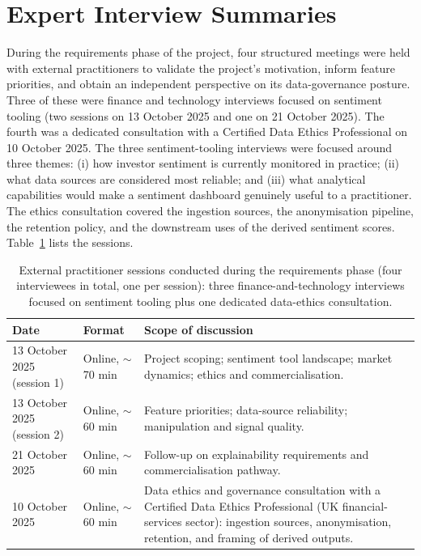 \section{Expert Interview Summaries}
\label{app:interviews}

During the requirements phase of the project, four structured meetings were held with external practitioners to validate the project's motivation, inform feature priorities, and obtain an independent perspective on its data-governance posture. Three of these were finance and technology interviews focused on sentiment tooling (two sessions on 13 October 2025 and one on 21 October 2025). The fourth was a dedicated consultation with a Certified Data Ethics Professional on 10 October 2025. The three sentiment-tooling interviews were focused around three themes: (i) how investor sentiment is currently monitored in practice; (ii) what data sources are considered most reliable; and (iii) what analytical capabilities would make a sentiment dashboard genuinely useful to a practitioner. The ethics consultation covered the ingestion sources, the anonymisation pipeline, the retention policy, and the downstream uses of the derived sentiment scores. Table~\ref{tab:interview_sessions} lists the sessions.

\begin{table}[!ht]
\centering
\small
\begin{tabular}{@{}llp{6.8cm}@{}}
\toprule
\textbf{Date} & \textbf{Format} & \textbf{Scope of discussion} \\
\midrule
13 October 2025 (session 1) & Online, $\sim$70 min & Project scoping; sentiment tool landscape; market dynamics; ethics and commercialisation. \\
13 October 2025 (session 2) & Online, $\sim$60 min & Feature priorities; data-source reliability; manipulation and signal quality. \\
21 October 2025            & Online, $\sim$60 min & Follow-up on explainability requirements and commercialisation pathway. \\
10 October 2025            & Online, $\sim$60 min & Data ethics and governance consultation with a Certified Data Ethics Professional (UK financial-services sector): ingestion sources, anonymisation, retention, and framing of derived outputs. \\
\bottomrule
\end{tabular}
\caption{External practitioner sessions conducted during the requirements phase (four interviewees in total, one per session): three finance-and-technology interviews focused on sentiment tooling plus one dedicated data-ethics consultation.}
\label{tab:interview_sessions}
\end{table}

